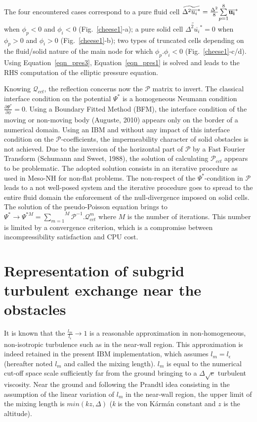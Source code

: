 The four encountered cases correspond to a pure fluid cell $\widetilde{\Delta^2 \overline{u_i}^{*}} = \frac{\Delta^2}{8}\overset{8}{\underset{p=1}{\sum}} \overline{{\bf u_i}}^{*}$ when $\phi_p<0$ and $\phi_i<0$ (Fig.~\ref{cheese1}-a); a pure solid cell $\widetilde{\Delta^2 \overline{u_i}^{*}} =0$ when $\phi_p>0$ and $\phi_i>0$ (Fig.~\ref{cheese1}-b); two types of truncated cells depending on the fluid/solid nature of the main node for which $\phi_p . \phi_i<0$ (Fig.~\ref{cheese1}-c/d). Using Equation~\eqref{eqn_pres3}, Equation~\eqref{eqn_pres1} is solved and leads to the RHS computation of the elliptic pressure equation. 

Knowing ${\mathcal Q}_{cct}$, the reflection concerns now the ${\mathcal P}$ matrix to invert. The classical interface condition on the potential $\Psi^{*}$ is a homogeneous Neumann condition $\frac{\partial \Psi^{*}}{\partial \phi}=0$. Using a Boundary Fitted Method (BFM), the interface condition of the moving or non-moving body (Auguste, 2010) appears only on the border of a numerical domain. Using an IBM and without any impact of this interface condition on the ${\mathcal P}$-coefficients, the impermeability character of solid obstacles is not achieved. Due to the inversion of the horizontal part of $\mathcal P$ by a Fast Fourier Transform (Schumann and Sweet, 1988), the solution of calculating ${\mathcal P}_{cct}$ appears to be problematic. The adopted solution consists in an iterative procedure as used in Meso-NH for non-flat problems. The non-respect of the $\Psi^*$-condition in ${\mathcal P}$ leads to a not well-posed system and the iterative procedure goes to spread to the entire fluid domain the enforcement of the null-divergence imposed on solid cells. The solution of the pseudo-Poisson equation brings to $\Psi^* \rightarrow \Psi^{*M}=\overset{M}{\underset{m=1}{\sum}}{\mathcal P}^{-1}.{\mathcal Q}_{cct}^{m}$ where $M$ is the number of iterations. This number is limited by a convergence criterion, which is a compromise between incompressibility satisfaction and CPU cost.
%
\section{Representation of subgrid turbulent exchange near the obstacles}
\label{S_WAL}
%
It is known that the $\frac{l_m}{l_\epsilon} \rightarrow 1$ is a reasonable approximation in non-homogeneous, non-isotropic turbulence such as in the near-wall region. This approximation is indeed retained in the present IBM implementation, which assumes $l_m=l_\epsilon$ (hereafter noted $l_m$ and called the mixing length). $l_m$ is equal to the numerical cut-off space scale sufficiently far from the ground bringing to a $\Delta \sqrt{e}$ turbulent viscosity. Near the ground and following the Prandtl idea consisting in the assumption of the linear variation of $l_m$ in the near-wall region, the upper limit of the mixing length is $min(kz,\Delta)$ ({\it k} is the von K\'arm\'an constant and $z$ is the altitude). 

